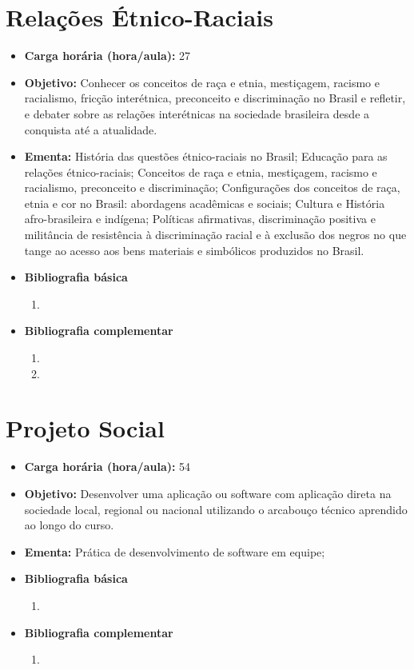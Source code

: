 \documentclass[11pt,fleqn]{book} %
\begin{document}
\section{Relações Étnico-Raciais}\label{4_etnicoraciais}
\begin{itemize}
	\item \textbf{Carga horária (hora/aula):} 27
	\item \textbf{Objetivo:} Conhecer os conceitos de raça e etnia, mestiçagem, racismo e racialismo, fricção interétnica, preconceito e discriminação no Brasil e refletir, e debater sobre as relações interétnicas na sociedade brasileira desde a conquista até a atualidade.
	\item \textbf{Ementa:} 
	História das questões étnico-raciais no Brasil;
	Educação para as relações étnico-raciais;
	Conceitos de raça e etnia, mestiçagem, racismo e racialismo, preconceito e discriminação;
	Configurações dos conceitos de raça, etnia e cor no Brasil: abordagens acadêmicas e sociais;
	Cultura e História afro-brasileira e indígena;
	Políticas afirmativas, discriminação positiva e militância de resistência à discriminação racial e à exclusão dos negros no que tange ao acesso aos bens materiais e simbólicos produzidos no Brasil.
	\item \textbf{Bibliografia básica}
	\begin{enumerate}
		\item 
	\end{enumerate}
	\item \textbf{Bibliografia complementar}
	\begin{enumerate}
		\item
		\item 
	\end{enumerate}
\end{itemize}

\newpage
\section{Projeto Social}\label{4_projsoc}
\begin{itemize}
	\item \textbf{Carga horária (hora/aula):} 54
	\item \textbf{Objetivo:} Desenvolver uma aplicação ou software com aplicação direta na sociedade local, regional ou nacional utilizando o arcabouço técnico aprendido ao longo do curso.
	\item \textbf{Ementa:} 
	Prática de desenvolvimento de software em equipe;
	\item \textbf{Bibliografia básica}
	\begin{enumerate}
		\item 
	\end{enumerate}
	\item \textbf{Bibliografia complementar}
	\begin{enumerate}
		\item 	
	\end{enumerate}	
\end{itemize}
\end{document}
